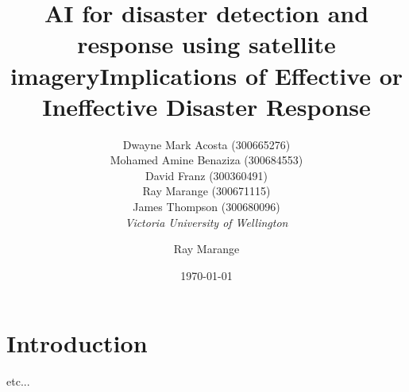 \documentclass[conference,a4paper]{IEEEtran}
\begin{document}
\newcommand{\cfigure}[2]{%
  \begin{figure}[h]
    \centering
    \texttt{[image: figures/\#1.png]}%
    \caption{#2}%
    \label{fig:#1}%
  \end{figure}%

}
\title{AI for disaster detection and response using satellite imagery}

\author{Dwayne Mark Acosta (300665276) \\ Mohamed Amine Benaziza (300684553) \\ David Franz (300360491) \\ Ray Marange (300671115) \\ James Thompson (300680096)\\
\textit{Victoria University of Wellington}\\}
\date{\today}

\maketitle

\section{Introduction}


\cite{elbohy2025fusion} etc...

\title{\bfseries\large Implications of Effective or Ineffective Disaster Response}
\author{Ray Marange}
\date{}
\end{document}
